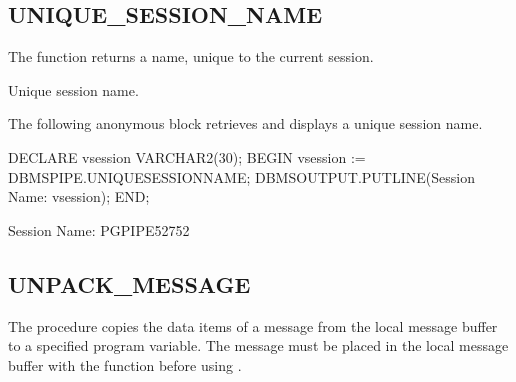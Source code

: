 \documentclass[letterpaper,10pt,english,openany,oneside]{sphinxmanual}
\begin{document}
\newpage


\subsection{UNIQUE\_SESSION\_NAME}
\label{\detokenize{unique_session_name::doc}}\label{\detokenize{unique_session_name:unique-session-name}}
The  function returns a name, unique to the current
session.




Unique session name.


The following anonymous block retrieves and displays a unique session
name.

%
\begin{sphinxVerbatim}[commandchars=\\\{\}]
DECLARE
    v\PYGZus{}session       VARCHAR2(30);
BEGIN
    v\PYGZus{}session := DBMS\PYGZus{}PIPE.UNIQUE\PYGZus{}SESSION\PYGZus{}NAME;
    DBMS\PYGZus{}OUTPUT.PUT\PYGZus{}LINE(\PYGZsq{}Session Name: \PYGZsq{} \textbar{}\textbar{} v\PYGZus{}session);
END;

Session Name: PG\PYGZdl{}PIPE\PYGZdl{}5\PYGZdl{}2752
\end{sphinxVerbatim}

\newpage


\subsection{UNPACK\_MESSAGE}
\label{\detokenize{unpack_message::doc}}\label{\detokenize{unpack_message:unpack-message}}
The  procedure copies the data items of a message from
the local message buffer to a specified program variable. The message
must be placed in the local message buffer with the 
function before using .
\begin{quote}

\end{quote}

\end{document}
